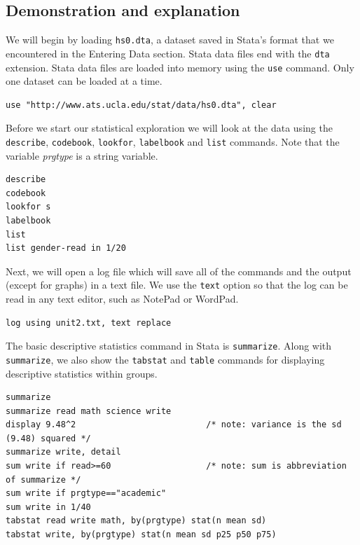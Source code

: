 \documentclass{article}
\begin{document}
\subsection{Demonstration and explanation}

We will begin by loading \lstinline{hs0.dta}, a dataset saved in Stata's format that we encountered in the Entering Data section. Stata data files end with the \lstinline{dta} extension. Stata data files are loaded into memory using the \lstinline{use} command.  Only one dataset can be loaded at a time.

\begin{lstlisting}
use "http://www.ats.ucla.edu/stat/data/hs0.dta", clear
\end{lstlisting}

Before we start our statistical exploration we will look at the data using the \lstinline{describe}, \lstinline{codebook}, \lstinline{lookfor}, \lstinline{labelbook} and \lstinline{list} commands. Note that the variable \textit{prgtype} is a string variable.

\begin{lstlisting}
describe
codebook
lookfor s
labelbook
list
list gender-read in 1/20
\end{lstlisting}

Next, we will open a log file which will save all of the commands and the output (except for graphs) in a text file.  We use the \lstinline{text} option so that the log can be read in any text editor, such as NotePad or WordPad.

\begin{lstlisting}
log using unit2.txt, text replace
\end{lstlisting}

The basic descriptive statistics command in Stata is \lstinline{summarize}. Along with \lstinline{summarize}, we also show the \lstinline{tabstat} and \lstinline{table} commands for displaying descriptive statistics within groups.

\begin{lstlisting}
summarize
summarize read math science write
display 9.48^2                          /* note: variance is the sd (9.48) squared */
summarize write, detail
sum write if read>=60                   /* note: sum is abbreviation of summarize */
sum write if prgtype=="academic"
sum write in 1/40
tabstat read write math, by(prgtype) stat(n mean sd)
tabstat write, by(prgtype) stat(n mean sd p25 p50 p75)
\end{lstlisting}
\end{document}

